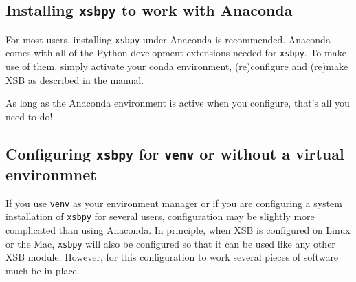 \subsection{Installing {\tt xsbpy} to work with Anaconda}

For most users, installing {\tt xsbpy} under Anaconda is
recommended.  Anaconda comes with all of the Python development
extensions needed for {\tt xsbpy}.  To make use of them, simply
activate your conda environment, (re)configure and (re)make XSB as
described in the manual.

As long as the Anaconda environment is active when you configure,
that's all you need to do!

\subsection{Configuring {\tt xsbpy} for {\tt venv} or without a virtual environmnet} \label{sec:xsbpy-linux}

If you use {\tt venv} as your environment manager or if you are
configuring a system installation of {\tt xsbpy} for several users,
configuration may be slightly more complicated than using Anaconda.
In principle, when XSB is configured on Linux or the Mac, {\tt xsbpy}
will also be configured so that it can be used like any other XSB
module.  However, for this configuration to work several pieces of
software much be in place.

